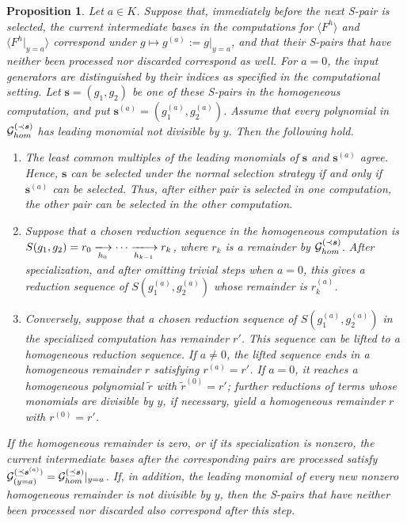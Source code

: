 \documentclass[10pt,a4paper]{amsart}
\newtheorem{proposition}{Proposition}
\begin{document}
\begin{proposition}\label{prop:sync_partial}
Let $a\in K$.
Suppose that, immediately before the next S-pair is selected, the current intermediate bases in the computations for $\langle F^h\rangle$ and $\langle F^h|_{y=a}\rangle$ correspond under $g\mapsto g^{(a)}:=g|_{y=a}$, and that their S-pairs that have neither been processed nor discarded correspond as well.
For $a=0$, the input generators are distinguished by their indices as specified in the computational setting.
Let $\bm{s}=(g_1,g_2)$ be one of these S-pairs in the homogeneous
computation, and put $\bm{s}^{(a)}=(g_1^{(a)},g_2^{(a)})$.
Assume that every polynomial in $\mathcal{G}_{\rm hom}^{(\prec\bm{s})}$ has leading monomial not divisible by $y$.
Then the following hold.
\begin{enumerate}
    \item[(1)] The least common multiples of the leading monomials of $\bm{s}$ and $\bm{s}^{(a)}$ agree.
    Hence, $\bm{s}$ can be selected under the normal selection strategy if and only if $\bm{s}^{(a)}$ can be selected.
    Thus, after either pair is selected in one computation, the other pair can be selected in the other computation.

    \item[(2)] Suppose that a chosen reduction sequence in the homogeneous computation is $S(g_1,g_2)=r_0 \xlongrightarrow[h_0]{}\cdots \xlongrightarrow[h_{k-1}]{}r_k$, where $r_k$ is a remainder by $\mathcal{G}_{\rm hom}^{(\prec\bm{s})}$.
    After specialization, and after omitting trivial steps when $a=0$,
    this gives a reduction sequence of $S(g_1^{(a)},g_2^{(a)})$ whose remainder is $r_k^{(a)}$.

    \item[(3)]
    Conversely, suppose that a chosen reduction sequence of $S(g_1^{(a)},g_2^{(a)})$ in the specialized computation has remainder $r'$.
    This sequence can be lifted to a homogeneous reduction sequence.
    If $a\neq0$, the lifted sequence ends in a homogeneous remainder $r$ satisfying $r^{(a)}=r'$.
    If $a=0$, it reaches a homogeneous polynomial $\widetilde r$ with $\widetilde r^{(0)}=r'$; further reductions of terms whose monomials are divisible by $y$, if necessary, yield a homogeneous remainder $r$ with $r^{(0)}=r'$.
\end{enumerate}
If the homogeneous remainder is zero, or if its specialization is nonzero, the current intermediate bases after the corresponding pairs are processed satisfy $\mathcal{G}_{(y=a)}^{(\preceq\bm{s}^{(a)})}= \mathcal{G}_{\rm hom}^{(\preceq\bm{s})}|_{y=a}$.
If, in addition, the leading monomial of every new nonzero homogeneous remainder is not divisible by $y$, then the S-pairs that have neither been processed nor discarded also correspond after this step.
\end{proposition}
\end{document}
